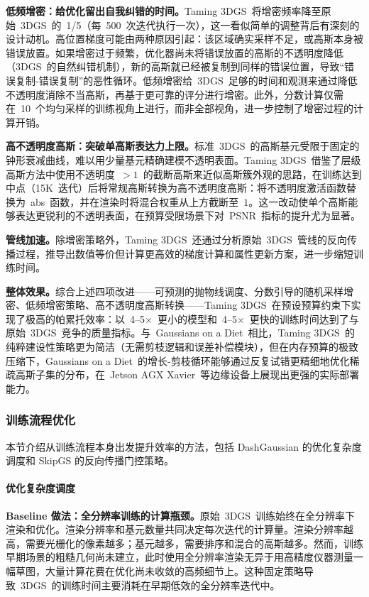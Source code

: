 \textbf{低频增密：给优化留出自我纠错的时间。}Taming 3DGS~将增密频率降至原始~3DGS~的~1/5（每~500~次迭代执行一次），这一看似简单的调整背后有深刻的设计动机。高位置梯度可能由两种原因引起：该区域确实采样不足，或高斯本身被错误放置。如果增密过于频繁，优化器尚未将错误放置的高斯的不透明度降低（3DGS~的自然纠错机制），新的高斯就已经被复制到同样的错误位置，导致``错误复制-错误复制''的恶性循环。低频增密给~3DGS~足够的时间和观测来通过降低不透明度消除不当高斯，再基于更可靠的评分进行增密。此外，分数计算仅需在~10~个均匀采样的训练视角上进行，而非全部视角，进一步控制了增密过程的计算开销。

\textbf{高不透明度高斯：突破单高斯表达力上限。}标准~3DGS~的高斯基元受限于固定的钟形衰减曲线，难以用少量基元精确建模不透明表面。Taming 3DGS~借鉴了层级高斯方法中使用不透明度~$>1$~的截断高斯来近似高斯簇外观的思路，在训练达到中点（15K~迭代）后将常规高斯转换为高不透明度高斯：将不透明度激活函数替换为~abs~函数，并在渲染时将混合权重从上方截断至~$1$。这一改动使单个高斯能够表达更锐利的不透明表面，在预算受限场景下对~PSNR~指标的提升尤为显著。

\textbf{管线加速。}除增密策略外，Taming 3DGS~还通过分析原始~3DGS~管线的反向传播过程，推导出数值等价但计算更高效的梯度计算和属性更新方案，进一步缩短训练时间。

\textbf{整体效果。}综合上述四项改进——可预测的抛物线调度、分数引导的随机采样增密、低频增密策略、高不透明度高斯转换——Taming 3DGS~在预设预算约束下实现了极高的帕累托效率：以~4--5$\times$~更小的模型和~4--5$\times$~更快的训练时间达到了与原始~3DGS~竞争的质量指标。与~Gaussians on a Diet~相比，Taming 3DGS~的纯粹建设性策略更为简洁（无需剪枝逻辑和误差补偿模块），但在内存预算的极致压缩下，Gaussians on a Diet~的增长-剪枝循环能够通过反复试错更精细地优化稀疏高斯子集的分布，在~Jetson AGX Xavier~等边缘设备上展现出更强的实际部署能力。

\subsubsection{训练流程优化}

本节介绍从训练流程本身出发提升效率的方法，包括 DashGaussian 的优化复杂度调度和 SkipGS 的反向传播门控策略。

\paragraph{优化复杂度调度}

\textbf{Baseline 做法：全分辨率训练的计算瓶颈。}原始~3DGS~训练始终在全分辨率下渲染和优化。渲染分辨率和基元数量共同决定每次迭代的计算量。渲染分辨率越高，需要光栅化的像素越多；基元越多，需要排序和混合的高斯越多。然而，训练早期场景的粗糙几何尚未建立，此时使用全分辨率渲染无异于用高精度仪器测量一幅草图，大量计算花费在优化尚未收敛的高频细节上。这种固定策略导致~3DGS~的训练时间主要消耗在早期低效的全分辨率迭代中。

